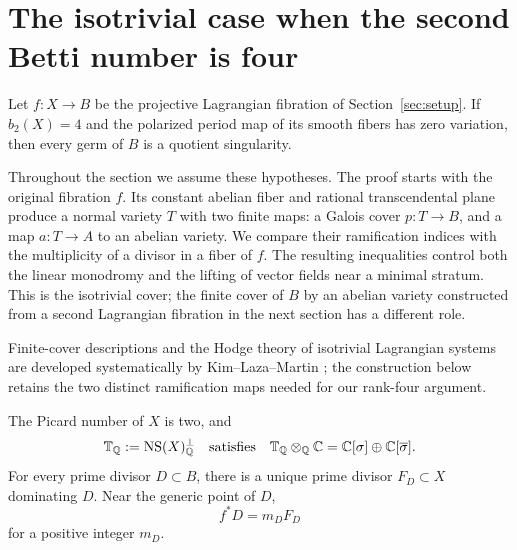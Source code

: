 \section{The isotrivial case when the second Betti number is four}
\label{iso:section}
\label{sec:isotrivial}

\begin{proposition}\label{iso:exclusion}
Let \(f:X\to B\) be the projective Lagrangian fibration of
Section~\ref{sec:setup}.  If \(b_2(X)=4\) and the polarized period map
of its smooth fibers has zero variation, then every germ of \(B\) is a
quotient singularity.
\end{proposition}

Throughout the section we assume these hypotheses.  The proof starts
with the original fibration \(f\).  Its constant abelian fiber and
rational transcendental plane produce a normal variety \(T\) with
two finite maps: a Galois cover \(p:T\to B\), and a map \(a:T\to A\)
to an abelian variety.  We compare their ramification indices with
the multiplicity of a divisor in a fiber of \(f\).  The resulting
inequalities control both the linear monodromy and the lifting of
vector fields near a minimal stratum.  This is the isotrivial cover;
the finite cover of \(B\) by an abelian variety constructed from a
second Lagrangian fibration in the next section has a different role.

Finite-cover descriptions and the Hodge theory of
isotrivial Lagrangian systems are developed systematically by
Kim--Laza--Martin \cite[Section~2.4]{KimLazaMartin2026}; the construction
below retains the two distinct ramification maps needed for our
rank-four argument.

\begin{lemma}\label{iso:vertical-divisor}
The Picard number of \(X\) is two, and
\[
 \mathbb T_{\mathbb Q}:=\operatorname{NS}(X)_{\mathbb Q}^{\perp}
 \quad\text{satisfies}\quad
 \mathbb T_{\mathbb Q}\otimes_{\mathbb Q}\mathbb C
   =\mathbb C[\sigma]\oplus\mathbb C[\overline{\sigma}].
\]
For every prime divisor \(D\subset B\), there is a unique prime divisor
\(F_D\subset X\) dominating \(D\).  Near the generic point of \(D\),
\[
                         f^*D=m_DF_D
\]
for a positive integer \(m_D\).
\end{lemma}

